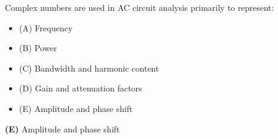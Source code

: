 

Complex numbers are used in AC circuit analysis primarily to represent:

\begin{itemize}
\item{(A)} Frequency
\vskip 5pt 
\item{(B)} Power
\vskip 5pt 
\item{(C)} Bandwidth and harmonic content
\vskip 5pt 
\item{(D)} Gain and attenuation factors
\vskip 5pt 
\item{(E)} Amplitude and phase shift
\end{itemize}







{\bf (E)} Amplitude and phase shift
 











